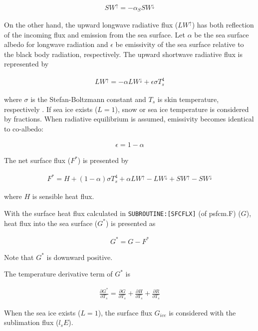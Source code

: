 \begin{eqnarray}
    SW^\uparrow = - \alpha_S SW^\downarrow
\end{eqnarray}

On the other hand, the upward longwave radiative flux (\(LW^\uparrow\))
has both reflection of the incoming flux and emission from the sea
surface. Let \(\alpha\) be the sea surface albedo for longwave radiation
and \(\epsilon\) be emissivity of the sea surface relative to the black
body radiation, respectively. The upward shortwave radiative flux is
represented by

\begin{eqnarray}
    LW^\uparrow = - \alpha LW^\downarrow + \epsilon \sigma T_s ^4
\end{eqnarray}

where \(\sigma\) is the Stefan-Boltzmann constant and \(T_s\) is skin
temperature, respectively . If sea ice exists (\(L=1\)), snow or sea ice
temperature is considered by fractions. When radiative equilibrium is
assumed, emissivity becomes identical to co-albedo:

\begin{eqnarray}
    \epsilon = 1 - \alpha
\end{eqnarray}

The net surface flux (\(F^*\)) is presented by

\begin{eqnarray}
    F^*=H + (1-\alpha)\sigma T_s^4 + \alpha LW^\uparrow - LW^\downarrow +SW^\uparrow - SW^\downarrow        
\end{eqnarray}

where \(H\) is sensible heat flux.

With the surface heat flux calculated in
\texttt{SUBROUTINE:{[}SFCFLX{]}} (of psfcm.F) (\(G\)), heat flux into
the sea surface (\(G^*\)) is presented as

\begin{eqnarray}
    G^* = G - F^*
\end{eqnarray}

Note that \(G^*\) is downward positive.

The temperature derivative term of \(G^*\) is

\begin{eqnarray}
    \frac{\partial G^*}{\partial T_s} = \frac{\partial G}{\partial T_s}+\frac{\partial H}{\partial T_s}+\frac{\partial R}{\partial T_s}
\end{eqnarray}

When the sea ice exists (\(L=1\)), the surface flux \(G_{ice}\) is
considered with the sublimation flux (\(l_s E\)).

